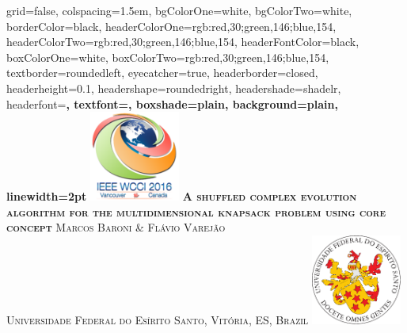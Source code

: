 \documentclass[landscape,final,a0paper,fontscale=0.38]{baposter}
\begin{document}
\begin{poster}%
  {
  grid=false,
  colspacing=1.5em,
  bgColorOne=white,
  bgColorTwo=white,
  borderColor=black,
  headerColorOne={rgb:red,30;green,146;blue,154},
  headerColorTwo={rgb:red,30;green,146;blue,154},
  headerFontColor=black,
  boxColorOne=white,
  boxColorTwo={rgb:red,30;green,146;blue,154},
  textborder=roundedleft,
  eyecatcher=true,
  headerborder=closed,
  headerheight=0.1\textheight,
  headershape=roundedright,
  headershade=shadelr,
  headerfont=\Large\bf\textsc, %
  textfont={\setlength{\parindent}{1.5em}},
  boxshade=plain,
  background=plain,
  linewidth=2pt
  }
  {\includegraphics[height=8em]{imgs/wcci-logo}} 
  {\bf\textsc{\LARGE \fontsize{19pt}{0.5cm}\selectfont A shuffled complex evolution algorithm for
the multidimensional knapsack problem using core concept}\vspace{0.3em}}
{\textsc{Marcos Baroni \& Flávio Varejão \\ \vspace{0.1em} {\large Universidade Federal do Es\'irito Santo, Vit\'oria, ES, Brazil} }}
  {%
    \includegraphics[height=8.0em]{../../brasao-ufes}
  }

%
\newcommand{\colouredcircle}{%
  \tikz{\useasboundingbox (-0.2em,-0.32em) rectangle(0.2em,0.32em); \draw[draw=black,fill=lightblue,line width=0.03em] (0,0) circle(0.18em);}}


\end{poster}
\end{document}
